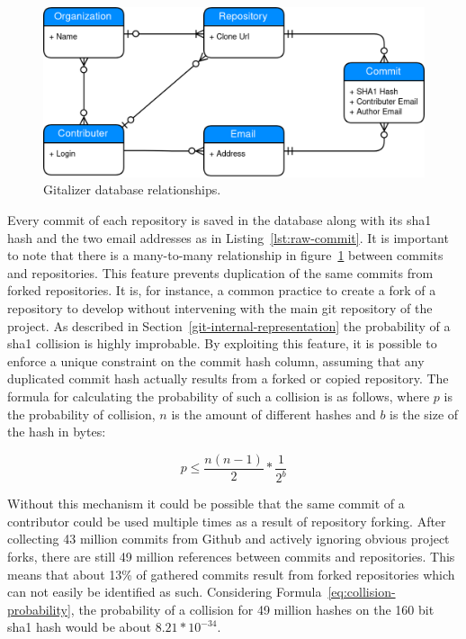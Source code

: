 \begin{figure}[H]
\includegraphics[scale=0.3]{./graphs/gitalizer-data-structure}
\centering
\caption{Gitalizer database relationships.}\label{fig:gitalizer-relationship}
\end{figure}

Every commit of each repository is saved in the database along with its \ac{sha1} hash and the two email addresses as in Listing~\ref{lst:raw-commit}.
It is important to note that there is a many-to-many relationship in figure~\ref{fig:gitalizer-relationship} between commits and repositories.
This feature prevents duplication of the same commits from forked repositories.
It is, for instance, a common practice to create a fork of a repository to develop without intervening with the main git repository of the project.
As described in Section~\ref{git-internal-representation} the probability of a \ac{sha1} collision is highly improbable.
By exploiting this feature, it is possible to enforce a unique constraint on the commit hash column, assuming that any duplicated commit hash actually results from a forked or copied repository.
The formula for calculating the probability of such a collision is as follows, where $p$ is the probability of collision, $n$ is the amount of different hashes and $b$ is the size of the hash in bytes:

\begin{equation}\label{eq:collision-probability}
    p \leq \frac{n(n-1)}{2} * \frac{1}{2^{b}}
\end{equation}

Without this mechanism it could be possible that the same commit of a contributor could be used multiple times as a result of repository forking.
After collecting 43 million commits from Github and actively ignoring obvious project forks, there are still 49 million references between commits and repositories.
This means that about 13\% of gathered commits result from forked repositories which can not easily be identified as such.
Considering Formula~\ref{eq:collision-probability}, the probability of a collision for 49 million hashes on the 160 bit \ac{sha1} hash would be about $8.21 * 10^{-34}$.

